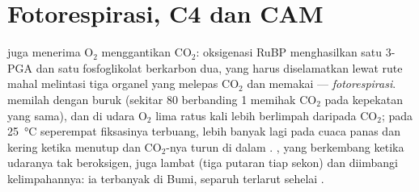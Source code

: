 \section{Fotorespirasi, C4 dan CAM}

\begin{proposition}\label{prop:b1:photosynthesis:photorespiration}
 juga menerima $\mathrm{O_2}$ menggantikan $\mathrm{CO_2}$:
oksigenasi RuBP menghasilkan satu 3-PGA dan satu fosfoglikolat berkarbon
dua, yang harus diselamatkan  lewat rute mahal melintasi tiga organel
yang melepas $\mathrm{CO_2}$ dan memakai  ---
\emph{fotorespirasi}.  memilah dengan buruk (sekitar
\qty{80}{} berbanding 1 memihak $\mathrm{CO_2}$ pada kepekatan yang
sama), dan di udara $\mathrm{O_2}$ lima ratus kali lebih berlimpah
daripada $\mathrm{CO_2}$; pada \qty{25}{\celsius} seperempat fiksasinya
terbuang, lebih banyak lagi pada cuaca panas dan kering ketika
 menutup dan $\mathrm{CO_2}$-nya turun di dalam .
, yang berkembang ketika udaranya tak beroksigen, juga lambat
(tiga putaran tiap sekon) dan diimbangi kelimpahannya: ia 
terbanyak di Bumi, separuh  terlarut sehelai .
\end{proposition}

